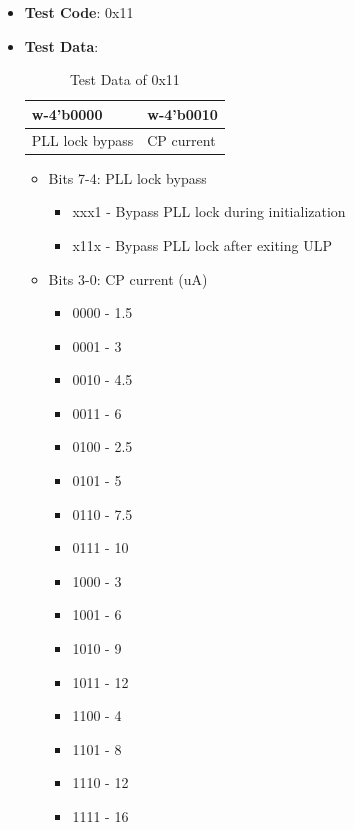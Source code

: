 \documentclass[main\_\_EN.tex]{subfiles}
\begin{document}
\begin{itemize}
    \item \textbf{Test Code}: 0x11
    \item \textbf{Test Data}: 
        \begin{longtable}{ |p{6cm}|p{6cm}|}
            \caption{Test Data of 0x11}
            \label{tab:test-data-0x11} \\
            \hline
            \rowcolor{lightgray}
            \textbf{w-4'b0000} & \textbf{w-4'b0010} \\ \hline
            PLL lock bypass & CP current  \\ \hline
        \end{longtable}
        \begin{itemize}
            \item Bits 7-4: PLL lock bypass
                \begin{itemize}
                    \item xxx1 - Bypass PLL lock during initialization
                    \item x11x - Bypass PLL lock after exiting ULP
                \end{itemize}
            \item Bits 3-0: CP current (uA)
                \begin{itemize}
                    \item 0000 - 1.5
                    \item 0001 - 3
                    \item 0010 - 4.5
                    \item 0011 - 6
                    \item 0100 - 2.5
                    \item 0101 - 5
                    \item 0110 - 7.5
                    \item 0111 - 10
                    \item 1000 - 3
                    \item 1001 - 6
                    \item 1010 - 9
                    \item 1011 - 12
                    \item 1100 - 4
                    \item 1101 - 8
                    \item 1110 - 12
                    \item 1111 - 16
                \end{itemize}

\end{itemize}
\end{itemize}
\end{document}
